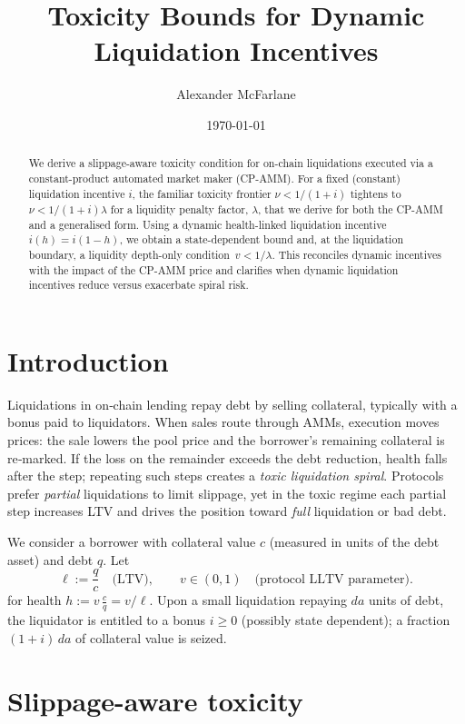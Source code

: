 \documentclass[11pt]{article}
\title{Toxicity Bounds for Dynamic Liquidation Incentives}
\author{Alexander McFarlane}
\date{\today}
\begin{document}
\maketitle

\begin{abstract}
We derive a slippage-aware toxicity condition for on-chain liquidations executed via a constant-product automated market maker (CP-AMM). For a fixed (constant) liquidation incentive \(i\), the familiar toxicity frontier \( \nu < 1/(1+i) \) tightens to
\(\nu < 1/(1+i)\lambda\) for a liquidity penalty factor, \(\lambda\), that we derive for both the CP-AMM and a generalised form. Using a dynamic health-linked liquidation incentive \(i(h) = i(1 - h)\), we obtain a state-dependent bound and, at the liquidation boundary, a liquidity depth-only condition \( \,v < 1/\lambda\). This reconciles dynamic incentives with the impact of the CP-AMM price and clarifies when dynamic liquidation incentives reduce versus exacerbate spiral risk.
\end{abstract}

\section{Introduction}
Liquidations in on‑chain lending repay debt by selling collateral, typically with a bonus paid to liquidators. When sales route through AMMs, execution moves prices: the sale lowers the pool price and the borrower’s remaining collateral is re‑marked. If the loss on the remainder exceeds the debt reduction, health falls after the step; repeating such steps creates a \emph{toxic liquidation spiral}. Protocols prefer \emph{partial} liquidations to limit slippage, yet in the toxic regime each partial step increases LTV and drives the position toward \emph{full} liquidation or bad debt.

We consider a borrower with collateral value \(c\) (measured in units of the debt asset) and debt \(q\). Let
\[
\ell := \frac{q}{c} \quad \text{(LTV)}, 
\qquad v \in (0,1) \quad \text{(protocol LLTV parameter)}.
\]
for health \( h := v\,\frac{c}{q} = v/\ell \). Upon a small liquidation repaying \(da\) units of debt, the liquidator is entitled to a bonus \(i \ge 0\) (possibly state dependent); a fraction \((1+i)\,da\) of collateral value is seized.

\section{Slippage-aware toxicity}
\end{document}
